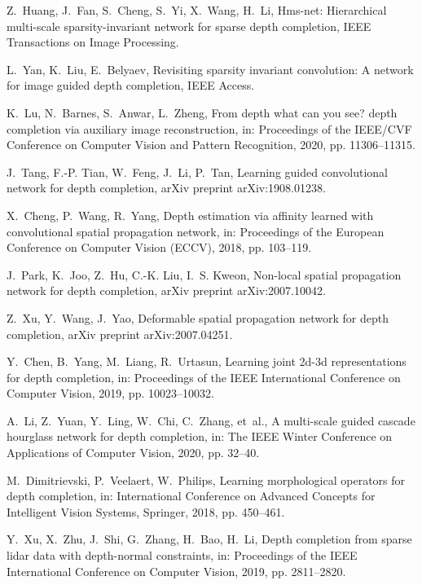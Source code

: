 \documentclass[5p]{elsarticle}
\begin{document}
\begin{thebibliography}{100}
Z.~Huang, J.~Fan, S.~Cheng, S.~Yi, X.~Wang, H.~Li, Hms-net: Hierarchical
  multi-scale sparsity-invariant network for sparse depth completion, IEEE
  Transactions on Image Processing.

L.~Yan, K.~Liu, E.~Belyaev, Revisiting sparsity invariant convolution: A
  network for image guided depth completion, IEEE Access.

K.~Lu, N.~Barnes, S.~Anwar, L.~Zheng, From depth what can you see? depth
  completion via auxiliary image reconstruction, in: Proceedings of the
  IEEE/CVF Conference on Computer Vision and Pattern Recognition, 2020, pp.
  11306--11315.

J.~Tang, F.-P. Tian, W.~Feng, J.~Li, P.~Tan, Learning guided convolutional
  network for depth completion, arXiv preprint arXiv:1908.01238.

X.~Cheng, P.~Wang, R.~Yang, Depth estimation via affinity learned with
  convolutional spatial propagation network, in: Proceedings of the European
  Conference on Computer Vision (ECCV), 2018, pp. 103--119.

J.~Park, K.~Joo, Z.~Hu, C.-K. Liu, I.~S. Kweon, Non-local spatial propagation
  network for depth completion, arXiv preprint arXiv:2007.10042.

Z.~Xu, Y.~Wang, J.~Yao, Deformable spatial propagation network for depth
  completion, arXiv preprint arXiv:2007.04251.

Y.~Chen, B.~Yang, M.~Liang, R.~Urtasun, Learning joint 2d-3d representations
  for depth completion, in: Proceedings of the IEEE International Conference on
  Computer Vision, 2019, pp. 10023--10032.

A.~Li, Z.~Yuan, Y.~Ling, W.~Chi, C.~Zhang, et~al., A multi-scale guided cascade
  hourglass network for depth completion, in: The IEEE Winter Conference on
  Applications of Computer Vision, 2020, pp. 32--40.

M.~Dimitrievski, P.~Veelaert, W.~Philips, Learning morphological operators for
  depth completion, in: International Conference on Advanced Concepts for
  Intelligent Vision Systems, Springer, 2018, pp. 450--461.

Y.~Xu, X.~Zhu, J.~Shi, G.~Zhang, H.~Bao, H.~Li, Depth completion from sparse
  lidar data with depth-normal constraints, in: Proceedings of the IEEE
  International Conference on Computer Vision, 2019, pp. 2811--2820.


\end{thebibliography}
\end{document}
